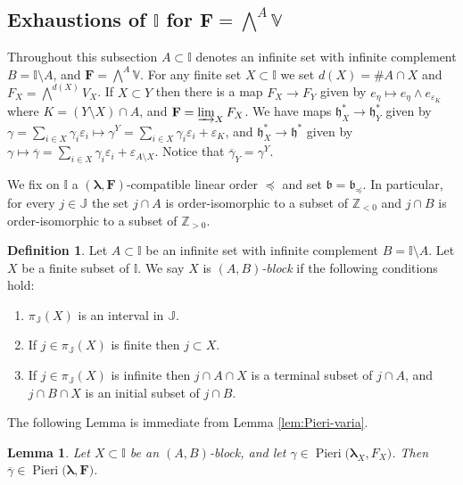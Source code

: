 \documentclass[11pt,fleqn]{amsart}
\newcommand\ZZ{\mathbb Z}
\newcommand\II{\mathbb I}
\newcommand\JJ{\mathbb J}
\renewcommand\to{\longrightarrow}
\renewcommand\epsilon{\varepsilon}
\newtheorem{lem}[thm]{Lemma}
\theoremstyle{definition}
\newtheorem{defn}[thm]{Definition}
\theoremstyle{remark}
\theoremstyle{remark}
\newcommand\VV{\mathbb V}
\newcommand\lie[1]{\mathfrak{#1}}
\newcommand\wt[1]{\boldsymbol{#1}}
\newcommand\Pieri[2]{\operatorname{Pieri}{(#1},{#2)}}
\begin{document}
\subsection{Exhaustions of $\II$ for $\mathbf F = \bigwedge^A \VV$}
\label{ss:fock-setup}
Throughout this subsection $A \subset \II$ denotes an infinite set with 
infinite complement $B = \II \setminus A$, and $\mathbf F = \bigwedge^ A \VV$. 
For any finite set $X \subset \II$ we set $d(X) = \# A \cap X$ and $F_X = 
\bigwedge^{d(X)} V_X$. If $X \subset Y$ then there is a map $F_X \to F_Y$ given 
by $e_\eta \mapsto e_\eta \wedge e_{\epsilon_{K}}$ where $K = (Y \setminus X) 
\cap A$, and $\mathbf F = \varinjlim_X F_X$. We have maps $\lie h_X^* \to 
\lie h^*_Y$ given by $\gamma = \sum_{i \in X} \gamma_i \epsilon_i \mapsto 
\gamma^Y = \sum_{i \in X} \gamma_i \epsilon_i + \epsilon_K$, and 
$\lie h^*_X \to \lie h^*$ given by $\gamma \mapsto \overline{\gamma} = 
\sum_{i \in X} \gamma_i \epsilon_i + \epsilon_{A \setminus X}$. Notice that 
$\overline{\gamma}_Y = \gamma^Y$.

We fix on $\II$ a $(\wt\lambda, \mathbf F)$-compatible linear order $\preceq$
and set $\lie b = \lie b_{\preceq}$. In particular, for every $j \in \JJ$ the 
set $j \cap A$ is order-isomorphic to a subset of $\ZZ_{<0}$ and $j \cap B$ is 
order-isomorphic to a subset of $\ZZ_{>0}$. 

\begin{defn}
Let $A \subset \II$ be an infinite set with infinite complement $B = \II 
\setminus A$. Let $X$ be a finite subset of $\II$. We say $X$ is 
\emph{$(A,B)$-block} if the following conditions hold:
\begin{enumerate}
  \item $\pi_\JJ(X)$ is an interval in $\JJ$.
  \item If $j \in \pi_\JJ(X)$ is finite then $j \subset X$.
  \item If $j \in \pi_\JJ(X)$ is infinite then $j \cap A \cap X$ is a terminal  
    subset of $j \cap A$, and $j \cap B \cap X$ is an initial subset of $j 
    \cap B$.
\end{enumerate}
\end{defn}

The following Lemma is immediate from Lemma \ref{lem:Pieri-varia}.
\begin{lem}
\label{lem:AB-compatible-pieri}
Let $X \subset \II$ be an $(A,B)$-block, and let $\gamma \in 
\Pieri{\wt\lambda_X}{F_X}$. Then $\overline{\gamma} \in 
\Pieri{\wt\lambda}{\mathbf F}$.
\end{lem}
\end{document}
